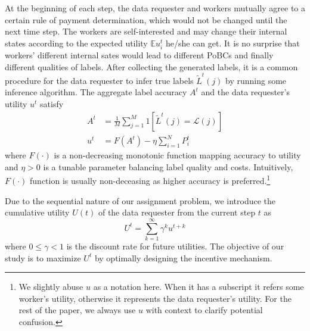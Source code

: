 At the beginning of each step, the data requester and workers mutually agree to a certain rule of payment determination, which would not be changed until the next time step.
The workers are self-interested and may change their internal states according to the expected utility $\mathbb{E}u_i^t$ he/she can get. It is no surprise that workers' different internal sates would lead to different PoBCs and finally different qualities of labels. After collecting the generated labels, it is a common procedure for the data requester to infer true labels $\tilde{L}^t(j)$ by running some inference algorithm.
The aggregate label accuracy $A^t$ and the data requester's utility $u^t$ satisfy
\begin{equation}
\label{equation:utility}
\begin{split}
A^t&=\frac{1}{M}{\sum}_{j=1}^{M}1\left[\tilde{L}^{t}(j)=\mathcal{L}(j)\right]\\
u^t &= F(A^t) - \eta {\sum}_{i=1}^{N}P^t_i
\end{split}
\end{equation}
where $F(\cdot)$ is a non-decreasing monotonic function mapping accuracy to utility and $\eta>0$ is a tunable parameter balancing label quality and costs. Intuitively, $F(\cdot)$ function is usually non-deceasing as higher accuracy is preferred.\footnote{We slightly abuse $u$ as a notation here. When it has a subscript it refers some worker's utility, otherwise it represents the data requester's utility. For the rest of the paper, we always use $u$ with context to clarify potential confusion.} 

Due to the sequential nature of our assignment problem, we introduce the cumulative utility $U(t)$ of the data requester from the current step $t$ as
\begin{equation}
U^t={\sum}_{k=1}^{\infty}\gamma^{k}u^{t+k}
\end{equation}
where $0\leq \gamma< 1$ is the discount rate for future utilities.
The objective of our study is to maximize $U^t$ by optimally designing %
the incentive mechanism.
